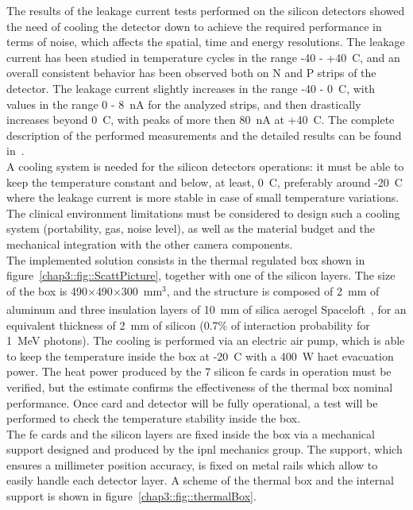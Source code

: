 The results of the leakage current tests performed on the silicon detectors showed the need of cooling the detector down to achieve the required performance in terms of noise, which affects the spatial, time and energy resolutions. The leakage current has been studied in temperature cycles in the range -40 - +40~\textdegree{}C, and an overall consistent behavior has been observed both on N and P strips of the detector. The leakage current slightly increases in the range -40 - 0~\textdegree{}C, with values in the range 0 - 8~nA for the analyzed strips, and then drastically increases beyond 0~\textdegree{}C, with peaks of more then 80~nA at +40~\textdegree{}C. The complete description of the performed measurements and the detailed results can be found in~\cite{Ley2015}.\\
A cooling system is needed for the silicon detectors operations: it must be able to keep the temperature constant and below, at least, 0~\textdegree{}C, preferably around -20~\textdegree{}C where the leakage current is more stable in case of small temperature variations. The clinical environment limitations must be considered to design such a cooling system (portability, gas, noise level), as well as the material budget and the mechanical integration with the other camera components.\\
The implemented solution consists in the thermal regulated box shown in figure~\ref{chap3::fig::ScattPicture}, together with one of the silicon layers. The size of the box is 490$\times$490$\times$300~mm$^3$, and the structure is composed of 2~mm of aluminum and three insulation layers of 10~mm of silica aerogel Spaceloft\textsuperscript{\textregistered}~\parencite{Spaceloft2011}, for an equivalent thickness of 2~mm of silicon (0.7\% of interaction probability for 1~MeV photons). The cooling is performed via an electric air pump, which is able to keep the temperature inside the box at -20~\textdegree{}C with a 400~W haet evacuation power. The heat power produced by the 7 silicon \gls{fe} cards in operation must be verified, but the estimate confirms the effectiveness of the thermal box nominal performance. Once card and detector will be fully operational, a test will be performed to check the temperature stability inside the box.\\
The 	\gls{fe} cards and the silicon layers are fixed inside the box via a mechanical support designed and produced by the \gls{ipnl} mechanics group. The support, which ensures a millimeter position accuracy, is fixed on metal rails which allow to easily handle each detector layer. A scheme of the thermal box and the internal support is shown in figure~\ref{chap3::fig::thermalBox}.
    
